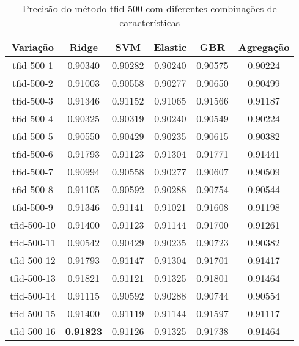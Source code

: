 \begin{table}[H]
\label{tab:precisiontfid500}
\centering
\begin{tabular}{|c| c c  c  c  c| }
\hline
Variação &  Ridge & SVM & Elastic & GBR & Agregação  \\ 
\hline
tfid-500-1 & 0.90340 & 0.90282 & 0.90240 & 0.90575 & 0.90224 \\
\hline
tfid-500-2 & 0.91003 & 0.90558 & 0.90277 & 0.90650 & 0.90499 \\
\hline
tfid-500-3 & 0.91346 & 0.91152 & 0.91065 & 0.91566 & 0.91187 \\
\hline
tfid-500-4 & 0.90325 & 0.90319 & 0.90240 & 0.90549 & 0.90224 \\
\hline
tfid-500-5 & 0.90550 & 0.90429 & 0.90235 & 0.90615 & 0.90382 \\
\hline
tfid-500-6 & 0.91793 & 0.91123 & 0.91304 & 0.91771 & 0.91441 \\
\hline
tfid-500-7 & 0.90994 & 0.90558 & 0.90277 & 0.90607 & 0.90509 \\
\hline
tfid-500-8 & 0.91105 & 0.90592 & 0.90288 & 0.90754 & 0.90544 \\
\hline
tfid-500-9 & 0.91346 & 0.91141 & 0.91021 & 0.91608 & 0.91198 \\
\hline
tfid-500-10 & 0.91400 & 0.91123 & 0.91144 & 0.91700 & 0.91261 \\
\hline
tfid-500-11 & 0.90542 & 0.90429 & 0.90235 & 0.90723 & 0.90382 \\
\hline
tfid-500-12 & 0.91793 & 0.91147 & 0.91304 & 0.91701 & 0.91417 \\
\hline
tfid-500-13 & 0.91821 & 0.91121 & 0.91325 & 0.91801 & 0.91464 \\
\hline
tfid-500-14 & 0.91115 & 0.90592 & 0.90288 & 0.90744 & 0.90554 \\
\hline
tfid-500-15 & 0.91400 & 0.91119 & 0.91144 & 0.91597 & 0.91117 \\
\hline
tfid-500-16 & \textbf{0.91823} & 0.91126 & 0.91325 & 0.91738 & 0.91464 \\
\hline
\end{tabular}
\caption{Precisão do método tfid-500 com diferentes combinações de características}
\end{table}


